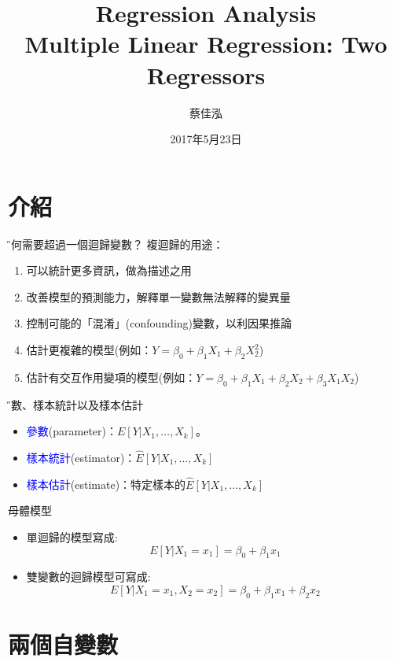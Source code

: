 \documentclass[xcolor=dvipsnames]{beamer}
\author[蔡佳泓]{\K 蔡佳泓}
\title[Statistical Methods for Social Sciences]{Regression Analysis\\
\smallskip
{\small {Multiple Linear Regression: Two Regressors}}}
\date[5/23/2017]{2017年5月23日} %
\institute[ESC \& GIEAS]{\H 國立政治大學選舉研究中心暨東亞研究所}
\begin{document}
\maketitle
\tableofcontents
\section{介紹}
\begin{frame}{\H 為何需要超過一個迴歸變數？}
複迴歸的用途：
\begin{enumerate}
\item 可以統計更多資訊，做為描述之用
\item 改善模型的預測能力，解釋單一變數無法解釋的變異量
\item 控制可能的「混淆」(confounding)變數，以利因果推論
\item 估計更複雜的模型(例如：$Y=\beta_{0}+\beta_{1}X_{1}+\beta_{2}X_{2}^2$)
\item 估計有交互作用變項的模型(例如：$Y=\beta_{0}+\beta_{1}X_{1}+\beta_{2}X_{2}+\beta_{3}X_{1}X_{2}$)
\end{enumerate}
\end{frame}
\begin{frame}{\H 參數、樣本統計以及樣本估計}
\begin{itemize}
\item \textcolor{blue}{參數}(parameter)：$E[Y|X_{1},\dotsc,X_{k}]$。
\item \textcolor{blue}{樣本統計}(estimator)：$\widehat{E}[Y|X_{1},\dotsc,X_{k}]$
\item \textcolor{blue}{樣本估計}(estimate)：特定樣本的$\widehat{E}[Y|X_{1},\dotsc,X_{k}]$
\end{itemize}
\end{frame}
\begin{frame}{母體模型}
\begin{itemize}
\item 單迴歸的模型寫成:
\[E[Y|X_{1}=x_{1}]=\beta_{0}+\beta_{1}x_{1}\]
\item 雙變數的迴歸模型可寫成:
\[E[Y|X_{1}=x_{1}, X_{2}=x_{2}]=\beta_{0}+\beta_{1}x_{1}+\beta_{2}x_{2}\]

\end{itemize}
\end{frame}
\section{兩個自變數}
\end{document}
